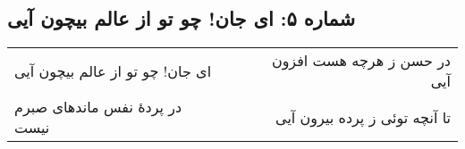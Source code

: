 \begin{center}
\section*{شماره ۵: ای جان! چو تو از عالم بیچون آیی}
\label{sec:005}
\begin{longtable}{l p{0.5cm} r}
ای جان! چو تو از عالم بیچون آیی
&&
در حسن ز هرچه هست افزون آیی
\\
در پردهٔ نفس ماندهای صبرم نیست
&&
تا آنچه توئی ز پرده بیرون آیی
\\
\end{longtable}
\end{center}
